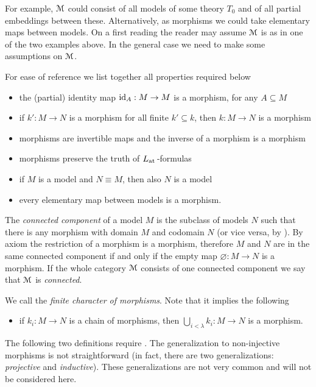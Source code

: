For example, $\EuScript M$ could consist of all models of some theory $T_0$ and of all partial embeddings between these.
Alternatively, as morphisms we could take elementary maps between models.
On a first reading the reader may assume $\EuScript M$ is as in one of the two examples above.
In the general case we need to make some assumptions on $\EuScript M$.

\begin{definition}\label{def_com_c}For ease of reference we list together all properties required below
\begin{itemize} 
\item[c1.] the (partial) identity map ${\rm id}_A:M\to M$ is a morphism, for any $A\subseteq M$
\item[c2.] if $k':M\to N$ is a morphism for all finite $k'\subseteq k$, then $k:M\to N$ is a morphism
\item[c3.] morphisms are invertible maps and the inverse of a morphism is a morphism
\item[c4.] morphisms preserve the truth of $L_{\rm at}$\,-formulas
\item[c5.] if $M$ is a model and $N\equiv M$, then also $N$ is a model
\item[c6.] every elementary map between models is a morphism.
\end{itemize}
\end{definition}

The \emph{connected component\/} of a model $M$ is the subclass of models $N$ such that there is any morphism with domain $M$ and codomain $N$ (or vice versa, by ).
By axiom  the restriction of a morphism is a morphism, therefore $M$ and $N$ are in the same connected component if and only if the empty map $\varnothing:M\to N$ is a morphism.
If the whole category $\EuScript M$ consists of one connected component we say that $\EuScript M$ is \emph{connected}.

We call  the \emph{finite character of morphisms}.
Note that it implies the following

\begin{itemize} 
\item[c7.] if $k_i:M\to N$ is a chain of morphisms, then $\displaystyle\bigcup_{i<\lambda} k_i:M\to N$ is a morphism.
\end{itemize}

The following two definitions require .
The generalization to non-injective morphisms is not straightforward (in fact, there are two generalizations: \textit{projective\/} and \textit{inductive\/}).
These generalizations are not very common and will not be considered here.

